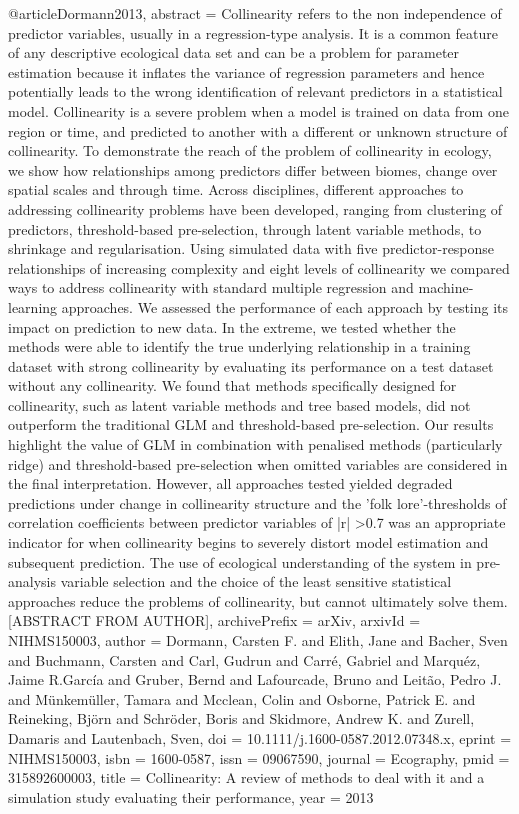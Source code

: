 {{{{{{{@article{Dormann2013,
abstract = {Collinearity refers to the non independence of predictor variables, usually in a regression-type analysis. It is a common feature of any descriptive ecological data set and can be a problem for parameter estimation because it inflates the variance of regression parameters and hence potentially leads to the wrong identification of relevant predictors in a statistical model. Collinearity is a severe problem when a model is trained on data from one region or time, and predicted to another with a different or unknown structure of collinearity. To demonstrate the reach of the problem of collinearity in ecology, we show how relationships among predictors differ between biomes, change over spatial scales and through time. Across disciplines, different approaches to addressing collinearity problems have been developed, ranging from clustering of predictors, threshold-based pre-selection, through latent variable methods, to shrinkage and regularisation. Using simulated data with five predictor-response relationships of increasing complexity and eight levels of collinearity we compared ways to address collinearity with standard multiple regression and machine-learning approaches. We assessed the performance of each approach by testing its impact on prediction to new data. In the extreme, we tested whether the methods were able to identify the true underlying relationship in a training dataset with strong collinearity by evaluating its performance on a test dataset without any collinearity. We found that methods specifically designed for collinearity, such as latent variable methods and tree based models, did not outperform the traditional GLM and threshold-based pre-selection. Our results highlight the value of GLM in combination with penalised methods (particularly ridge) and threshold-based pre-selection when omitted variables are considered in the final interpretation. However, all approaches tested yielded degraded predictions under change in collinearity structure and the 'folk lore'-thresholds of correlation coefficients between predictor variables of |r| >0.7 was an appropriate indicator for when collinearity begins to severely distort model estimation and subsequent prediction. The use of ecological understanding of the system in pre-analysis variable selection and the choice of the least sensitive statistical approaches reduce the problems of collinearity, but cannot ultimately solve them. [ABSTRACT FROM AUTHOR]},
archivePrefix = {arXiv},
arxivId = {NIHMS150003},
author = {Dormann, Carsten F. and Elith, Jane and Bacher, Sven and Buchmann, Carsten and Carl, Gudrun and Carr{\'{e}}, Gabriel and Marqu{\'{e}}z, Jaime R.Garc{\'{i}}a and Gruber, Bernd and Lafourcade, Bruno and Leit{\~{a}}o, Pedro J. and M{\"{u}}nkem{\"{u}}ller, Tamara and Mcclean, Colin and Osborne, Patrick E. and Reineking, Bj{\"{o}}rn and Schr{\"{o}}der, Boris and Skidmore, Andrew K. and Zurell, Damaris and Lautenbach, Sven},
doi = {10.1111/j.1600-0587.2012.07348.x},
eprint = {NIHMS150003},
isbn = {1600-0587},
issn = {09067590},
journal = {Ecography},
pmid = {315892600003},
title = {{Collinearity: A review of methods to deal with it and a simulation study evaluating their performance}},
year = {2013}
}

}}}}}}}
